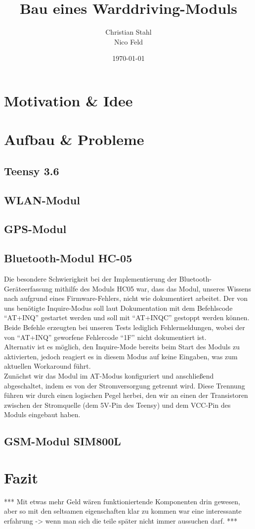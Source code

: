 \documentclass[a4paper,11pt, ngerman]{scrartcl}
\author{Christian Stahl\\Nico Feld}
\title{Bau eines Warddriving-Moduls}
\date{\today}
\begin{document}
\maketitle
\pagebreak
{}
\tableofcontents
\pagebreak
\section{Motivation \& Idee}
\section{Aufbau \& Probleme}
\subsection{Teensy 3.6}
\subsection{WLAN-Modul}
\subsection{GPS-Modul}
\subsection{Bluetooth-Modul HC-05}
Die besondere Schwierigkeit bei der Implementierung der Bluetooth-Geräteerfassung mithilfe des Moduls HC05 war, dass das Modul, unseres Wissens nach aufgrund eines Firmware-Fehlers, nicht wie dokumentiert arbeitet. Der von uns benötigte Inquire-Modus soll laut Dokumentation mit dem Befehlscode \enquote{AT+INQ} gestartet werden und soll mit \enquote{AT+INQC} gestoppt werden können. Beide Befehle erzeugten bei unseren Tests lediglich Fehlermeldungen, wobei der von \enquote{AT+INQ} geworfene Fehlercode \enquote{1F} nicht dokumentiert ist.\\
Alternativ ist es möglich, den Inquire-Mode bereits beim Start des Moduls zu aktivierten, jedoch reagiert es in diesem Modus auf keine Eingaben, was zum aktuellen Workaround führt.\\
Zunächst wir das Modul im AT-Modus konfiguriert und anschließend abgeschaltet, indem es von der Stromversorgung getrennt wird. Diese Trennung führen wir durch einen logischen Pegel herbei, den wir an einen der Transistoren zwischen der Stromquelle (dem 5V-Pin des Teensy) und dem VCC-Pin des Moduls eingebaut haben.
\subsection{GSM-Modul SIM800L}
\section{Fazit}
*** Mit etwas mehr Geld wären funktioniertende Komponenten drin gewesen, aber so mit den seltsamen eigenschaften klar zu kommen war eine interessante erfahrung -> wenn man sich die teile später nicht immer aussuchen darf. ***
\nocite{*}
\end{document}
